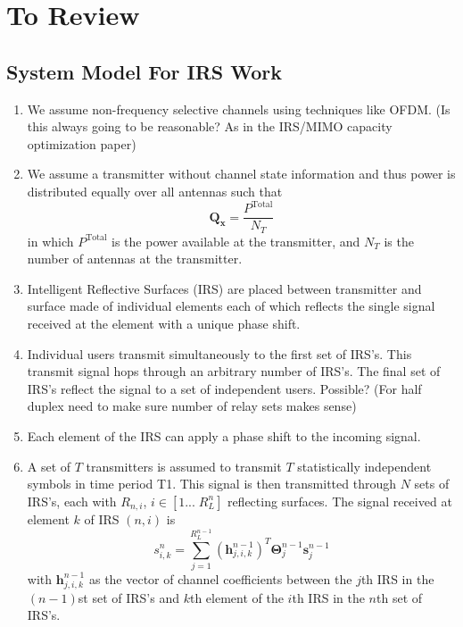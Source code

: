 \documentclass[12pt,a4paper]{report}
\author{Peter Hartig}
\begin{document}
\chapter{To Review}
\section{System Model For IRS Work}
\begin{enumerate}
\item 
	We assume non-frequency selective channels using techniques like OFDM. (Is this always going to be reasonable? As in the IRS/MIMO capacity optimization paper)
	
\item 
	We assume a transmitter without channel state information and thus power is distributed equally over all antennas such that
	\begin{equation}
	\mathbf{Q_{\mathbf{x}}} = \frac{P^{\text{Total}}}{N_T}
	\end{equation}
	in which $P^{\text{Total}}$ is the power available at the transmitter, and $N_T$ is the number of antennas at the transmitter. 
	
\item Intelligent Reflective Surfaces (IRS) are placed between transmitter and surface made of individual elements each of which reflects the single signal received at the element with a unique phase shift.
\item Individual users transmit simultaneously to the first set of IRS's. This transmit signal hops through an arbitrary number of IRS's. The final set of IRS's reflect the signal to a set of independent users. Possible? (For half duplex need to make sure number of relay sets makes sense)

\item
Each element of the IRS can apply a phase shift to the incoming signal.
\item 
A set of $T$ transmitters is assumed to transmit $T$ statistically independent symbols in time period T1. This signal is then transmitted through $N$ sets of IRS's, each with $R_{n,i}$, $i \in [1... \; R^n_L]$ reflecting surfaces. The signal received at element $k$ of IRS $(n,i)$ is 
\begin{equation}
s^{n}_{i,k} = \sum_{j = 1}^{R^{n-1}_L} (\mathbf{h}^{n-1}_{j,i,k})^T \boldsymbol{\Theta}^{n-1}_{j}\mathbf{s}^{n-1}_{j}
\end{equation}
with $\mathbf{h}^{n-1}_{j,i,k}$ as the vector of channel coefficients between the $j$th IRS in the $(n-1)$st set of IRS's and $k$th element of the $i$th IRS in the $n$th set of IRS's.


\end{enumerate}
\end{document}
